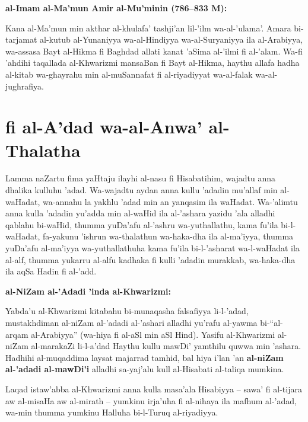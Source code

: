 \documentclass[11pt,a4paper]{book}
\begin{document}
\begin{historicalbox}
\textbf{al-Imam al-Ma'mun Amir al-Mu'minin (786--833 M):}

Kana al-Ma'mun min akthar al-khulafa' tashji'an lil-'ilm wa-al-'ulama'.
Amara bi-tarjamat al-kutub al-Yunaniyya wa-al-Hindiyya wa-al-Suryaniyya
ila al-Arabiyya, wa-assasa Bayt al-Hikma fi Baghdad allati kanat 'aSima
al-'ilmi fi al-'alam. Wa-fi 'ahdihi taqallada al-Khwarizmi mansaBan fi
Bayt al-Hikma, haythu allafa hadha al-kitab wa-ghayrahu min al-muSannafat
fi al-riyadiyyat wa-al-falak wa-al-jughrafiya.
\end{historicalbox}

\newpage

\chapter{fi al-A'dad wa-al-Anwa' al-Thalatha}
\label{ch:intro}

\begin{originaltext}
Lamma naZartu fima yaHtaju ilayhi al-nasu fi Hisabatihim, wajadtu
anna dhalika kulluhu 'adad. Wa-wajadtu aydan anna kullu 'adadin
mu'allaf min al-waHadat, wa-annahu la yakhlu 'adad min an yanqasim
ila waHadat. Wa-'alimtu anna kulla 'adadin yu'adda min al-waHid ila
al-'ashara yazidu 'ala alladhi qablahu bi-waHid, thumma yuDa'afu
al-'ashru wa-yuthallathu, kama fu'ila bi-l-waHadat, fa-yakunu
'ishrun wa-thalathun wa-haka-dha ila al-ma'iyya, thumma yuDa'afu
al-ma'iyya wa-yuthallathuha kama fu'ila bi-l-'asharat wa-l-waHadat ila
al-alf, thumma yukarru al-alfu kadhaka fi kulli 'adadin murakkab,
wa-haka-dha ila aqSa Hadin fi al-'add.
\end{originaltext}

\begin{commentary}
\textbf{al-NiZam al-'Adadi 'inda al-Khwarizmi:}

Yabda'u al-Khwarizmi kitabahu bi-munaqasha falsafiyya li-l-'adad,
mustakhdiman al-niZam al-'adadi al-'ashari alladhi yu'rafu al-yawma
bi-``al-arqam al-Arabiyya'' (wa-hiya fi al-aSl min aSl Hind).
Yasifu al-Khwarizmi al-niZam al-marakaZi li-l-a'dad Haythu kullu
mawDi' yamthilu quwwa min 'ashara. Hadhihi al-muqaddima laysat
majarrad tamhid, bal hiya i'lan 'an \textbf{al-niZam al-'adadi
al-mawDi'i} alladhi sa-yaj'alu kull al-Hisabati al-taliqa mumkina.

Laqad istaw'abba al-Khwarizmi anna kulla masa'ala Hisabiyya -- sawa'
fi al-tijara aw al-misaHa aw al-mirath -- yumkinu irja'uha fi
al-nihaya ila mafhum al-'adad, wa-min thumma yumkinu Halluha bi-l-Turuq
al-riyadiyya.
\end{commentary}
\end{document}
